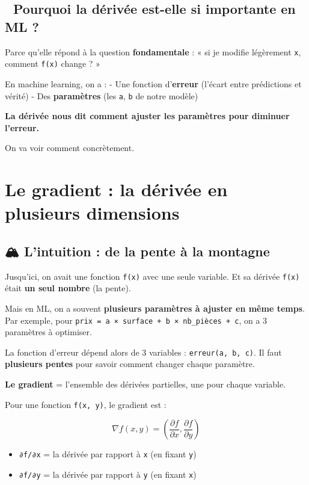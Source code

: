 \documentclass[
  french,
  11pt,
  a4paper,
]{scrbook}
\providecommand{\tightlist}{%
  \setlength{\itemsep}{0pt}\setlength{\parskip}{0pt}}
\begin{document}
\section{🤔 Pourquoi la dérivée est-elle si importante en ML
?}\label{pourquoi-la-duxe9rivuxe9e-est-elle-si-importante-en-ml}

Parce qu'elle répond à la question \textbf{fondamentale} : « si je
modifie légèrement \texttt{x}, comment \texttt{f(x)} change ? »

En machine learning, on a : - Une fonction d'\textbf{erreur} (l'écart
entre prédictions et vérité) - Des \textbf{paramètres} (les \texttt{a},
\texttt{b} de notre modèle)

\textbf{La dérivée nous dit comment ajuster les paramètres pour diminuer
l'erreur.}

On va voir comment concrètement.

\chapter{Le gradient : la dérivée en plusieurs
dimensions}\label{le-gradient-la-duxe9rivuxe9e-en-plusieurs-dimensions}

\section{🏔️ L'intuition : de la pente à la
montagne}\label{lintuition-de-la-pente-uxe0-la-montagne}

Jusqu'ici, on avait une fonction \texttt{f(x)} avec une seule variable.
Et sa dérivée \texttt{f\textquotesingle{}(x)} était \textbf{un seul
nombre} (la pente).

Mais en ML, on a souvent \textbf{plusieurs paramètres à ajuster en même
temps}. Par exemple, pour
\texttt{prix\ =\ a\ ×\ surface\ +\ b\ ×\ nb\_pièces\ +\ c}, on a 3
paramètres à optimiser.

La fonction d'erreur dépend alors de 3 variables :
\texttt{erreur(a,\ b,\ c)}. Il faut \textbf{plusieurs pentes} pour
savoir comment changer chaque paramètre.

\textbf{Le gradient} = l'ensemble des dérivées partielles, une pour
chaque variable.

Pour une fonction \texttt{f(x,\ y)}, le gradient est :

\[\nabla f(x, y) = \left( \frac{\partial f}{\partial x}, \frac{\partial f}{\partial y} \right)\]

\begin{itemize}
\tightlist
\item
  \texttt{∂f/∂x} = la dérivée par rapport à \texttt{x} (en fixant
  \texttt{y})
\item
  \texttt{∂f/∂y} = la dérivée par rapport à \texttt{y} (en fixant
  \texttt{x})
\end{itemize}
\end{document}
